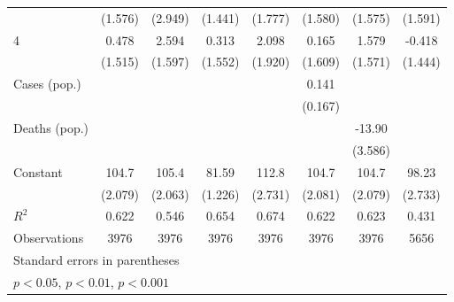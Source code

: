 \documentclass{article}
\begin{document}
{\begin{longtable}{l*{7}{c}}
                &  (1.576)         &  (2.949)         &  (1.441)         &  (1.777)         &  (1.580)         &  (1.575)         &  (1.591)         \\
4               &    0.478         &    2.594         &    0.313         &    2.098         &    0.165         &    1.579         &   -0.418         \\
                &  (1.515)         &  (1.597)         &  (1.552)         &  (1.920)         &  (1.609)         &  (1.571)         &  (1.444)         \\
Cases (pop.)    &                  &                  &                  &                  &    0.141         &                  &                  \\
                &                  &                  &                  &                  &  (0.167)         &                  &                  \\
Deaths (pop.)   &                  &                  &                  &                  &                  &   -13.90\sym{***}&                  \\
                &                  &                  &                  &                  &                  &  (3.586)         &                  \\
Constant        &    104.7\sym{***}&    105.4\sym{***}&    81.59\sym{***}&    112.8\sym{***}&    104.7\sym{***}&    104.7\sym{***}&    98.23\sym{***}\\
                &  (2.079)         &  (2.063)         &  (1.226)         &  (2.731)         &  (2.081)         &  (2.079)         &  (2.733)         \\
\hline
\(R^{2}\)       &    0.622         &    0.546         &    0.654         &    0.674         &    0.622         &    0.623         &    0.431         \\
Observations    &     3976         &     3976         &     3976         &     3976         &     3976         &     3976         &     5656         \\
\hline\hline
\multicolumn{8}{l}{\footnotesize Standard errors in parentheses}\\
\multicolumn{8}{l}{\footnotesize \sym{*} \(p<0.05\), \sym{**} \(p<0.01\), \sym{***} \(p<0.001\)}\\
\end{longtable}
}
\end{document}
